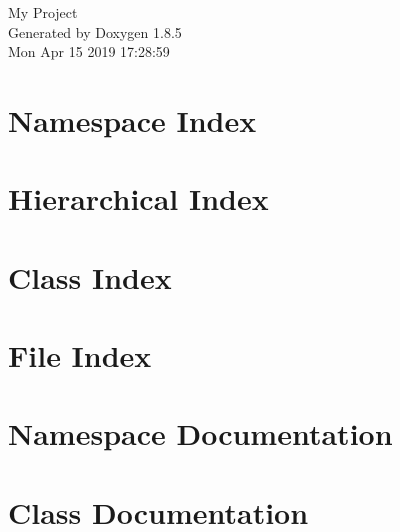 \documentclass[twoside]{book}
\newcommand{\clearemptydoublepage}{%
  \newpage{\pagestyle{empty}\cleardoublepage}%
}
\begin{document}
\hypersetup{pageanchor=false}
\begin{titlepage}
\vspace*{7cm}
\begin{center}%
{\Large My Project }\\
\vspace*{1cm}
{\large Generated by Doxygen 1.8.5}\\
\vspace*{0.5cm}
{\small Mon Apr 15 2019 17:28:59}\\
\end{center}
\end{titlepage}
\clearemptydoublepage
\tableofcontents
\clearemptydoublepage
{}
\hypersetup{pageanchor=true}

\chapter{Namespace Index}

\chapter{Hierarchical Index}

\chapter{Class Index}

\chapter{File Index}

\chapter{Namespace Documentation}

\chapter{Class Documentation}




































\end{document}

